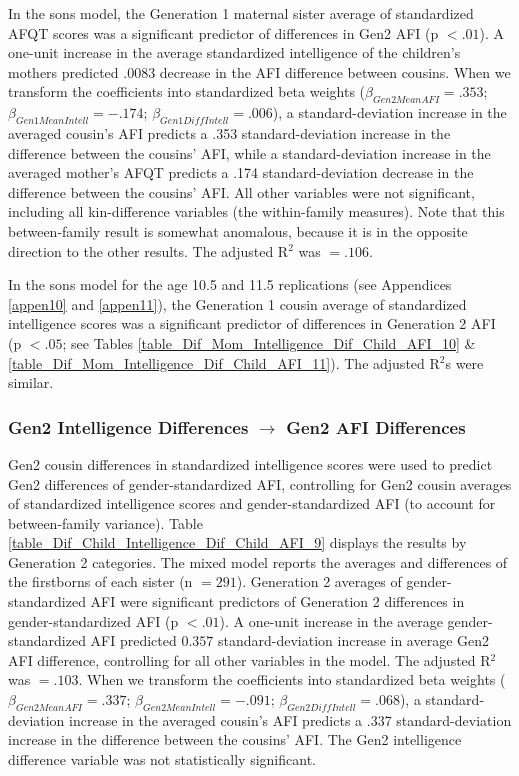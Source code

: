 In the sons model, the Generation 1 maternal sister average of standardized AFQT scores was a significant predictor of differences in Gen2 AFI (p $< .01$). A one-unit increase in the average standardized intelligence of the children's mothers predicted $.0083$ decrease in the AFI difference between cousins. When we transform the coefficients into standardized beta weights ($\beta_{Gen2 Mean AFI} = .353$; $\beta_{Gen1 Mean Intell} = -.174$; $\beta_{Gen1 Diff Intell} = .006$), a standard-deviation increase in the averaged cousin's AFI predicts a .353 standard-deviation increase in the difference between the cousins' AFI, while a standard-deviation increase in the averaged mother's AFQT predicts a .174 standard-deviation decrease in the difference between the cousins' AFI. All other variables were not significant, including all kin-difference variables (the within-family measures). Note that this between-family result is somewhat anomalous, because it is in the opposite direction to the other results. The adjusted R$^{2}$ was $= .106$.

In the sons model for the age 10.5 and 11.5 replications (see Appendices \ref{appen10} and \ref{appen11}), the Generation 1 cousin average of standardized intelligence scores was a significant predictor of differences in Generation 2 AFI (p $< .05$; see Tables \ref{table_Dif_Mom_Intelligence_Dif_Child_AFI_10} \& \ref{table_Dif_Mom_Intelligence_Dif_Child_AFI_11}). The adjusted R$^{2}$s were similar. 

\subsubsection{Gen2 Intelligence Differences $\rightarrow$ Gen2 AFI Differences}
Gen2 cousin differences in standardized intelligence scores were used to predict Gen2 differences of gender-standardized AFI, controlling for Gen2 cousin averages of standardized intelligence scores and gender-standardized AFI (to account for between-family variance). Table \ref{table_Dif_Child_Intelligence_Dif_Child_AFI_9} displays the results by Generation 2 categories. The mixed model reports the averages and differences of the firstborns of each sister (n $= 291$). Generation 2 averages of gender-standardized AFI were significant predictors of Generation 2 differences in gender-standardized AFI (p $< .01$). A one-unit increase in the average gender-standardized AFI predicted $0.357$ standard-deviation increase in average Gen2 AFI difference, controlling for all other variables in the model. The adjusted R$^{2}$ was $= .103$. When we transform the coefficients into standardized beta weights ($\beta_{Gen2 Mean AFI} = .337$; $\beta_{Gen2 Mean Intell} = -.091$; $\beta_{Gen2 Diff Intell} = .068$), a standard-deviation increase in the averaged cousin's AFI predicts a .337 standard-deviation increase in the difference between the cousins' AFI. The Gen2 intelligence difference variable was not statistically significant.

